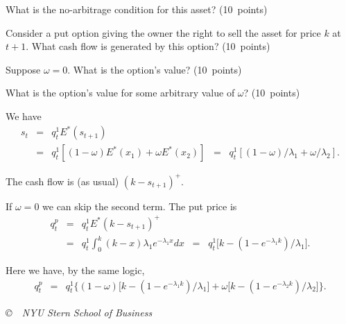 \documentclass[11pt]{exam}
\begin{document}
\begin{questions}
\begin{parts}
\item What is the no-arbitrage condition for this asset?
(10~points)
\item Consider a put option giving the owner the right to sell
the asset for price $k$ at $t+1$.
What cash flow is generated by this option?
(10~points)
\item Suppose $\omega = 0$.
What is the option's value?
(10~points)
\item What is the option's value for some arbitrary value of $\omega$?
(10~points)
\end{parts}

\begin{solution}
\begin{parts}
\item We have
\begin{eqnarray*}
    s_t &=& q^1_t E^* (s_{t+1}) \\
            &=& q^1_t [(1-\omega) E^*(x_1) + \omega E^*(x_2)]
            \;\;=\;\; q^1_t [(1-\omega)/\lambda_1 + \omega /\lambda_2] .
\end{eqnarray*}
\item The cash flow is (as usual) $ (k-s_{t+1})^+ $.
\item If $\omega=0$ we can skip the second term.
The put price is
\begin{eqnarray*}
    q^p_t &=& q^1_t E^* (k-s_{t+1})^+  \\
            &=& q^1_t \int_{0}^{k} (k-x) \lambda_1 e^{-\lambda_1 x } dx
            \;\;=\;\;  q^1_t \big[ k - ( 1-e^{-\lambda_1 k})/\lambda_1 \big] .
\end{eqnarray*}
\item Here we have, by the same logic,
\begin{eqnarray*}
    q^p_t &=& q^1_t \Big\{
        (1-\omega) \big[ k - ( 1-e^{-\lambda_1 k})/\lambda_1 \big]
        + \omega \big[ k - ( 1-e^{-\lambda_2 k})/\lambda_2 \big]
        \Big\} .
\end{eqnarray*}

\end{parts}
\end{solution}

\end{questions}

\phantom{xx}
\vfill \centerline{\it \copyright \ \number\year \
NYU Stern School of Business}
\end{document}
